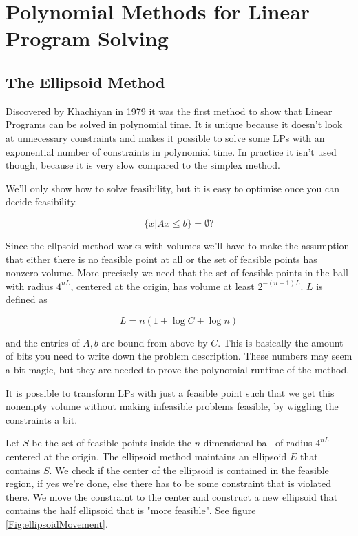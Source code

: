 \chapter{Polynomial Methods for Linear Program Solving}

\section{The Ellipsoid Method}

Discovered by \href{http://en.wikipedia.org/wiki/Leonid\_Khachiyan}{Khachiyan} in 1979 it was the first method to show that Linear Programs can be solved in polynomial time. It is unique because it doesn't look at unnecessary constraints and makes it possible to solve some LPs with an exponential number of constraints in polynomial time. In practice it isn't used though, because it is very slow compared to the simplex method.

We'll only show how to solve feasibility, but it is easy to optimise once you can decide feasibility.

\[\{x|Ax\leq b\} = \emptyset?\]

Since the ellpsoid method works with volumes we'll have to make the assumption that either there is no feasible point at all or the set of feasible points has nonzero volume. More precisely we need that the set of feasible points in the ball with radius $4^{nL}$, centered at the origin, has volume at least $2^{-(n+1)L}$. $L$ is defined as 

\[L=n(1+\log C+\log n)\]

and the entries of $A,b$ are bound from above by $C$. This is basically the amount of bits you need to write down the problem description. These numbers may seem a bit magic, but they are needed to prove the polynomial runtime of the method.

It is possible to transform LPs with just a feasible point such that we get this nonempty volume without making infeasible problems feasible, by wiggling the constraints a bit.

Let $S$ be the set of feasible points inside the $n$-dimensional ball of radius $4^{nL}$ centered at the origin. The ellipsoid method maintains an ellipsoid $E$ that contains $S$. We check if the center of the ellipsoid is contained in the feasible region, if yes we're done, else there has to be some constraint that is violated there. We move the constraint to the center and construct a new ellipsoid that contains the half ellipsoid that is "more feasible". See figure \ref{Fig:ellipsoidMovement}.

